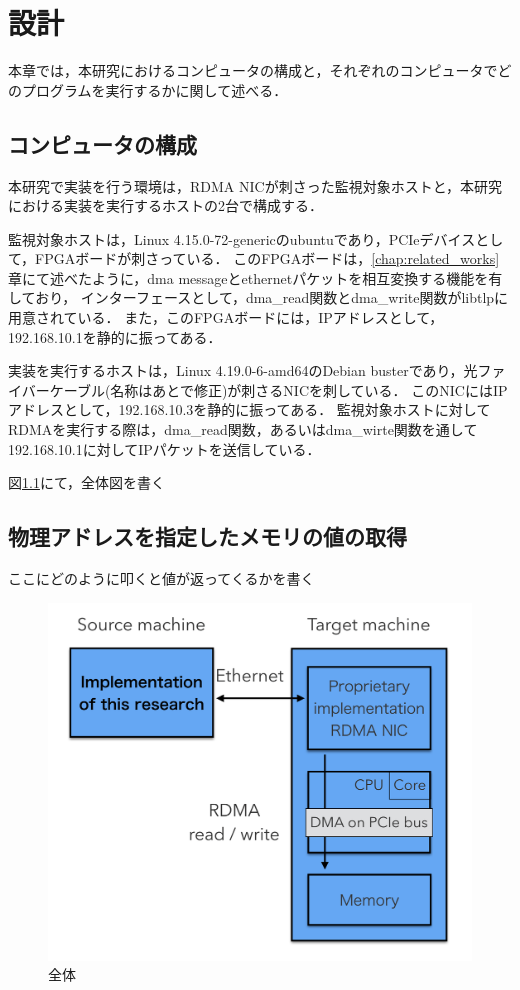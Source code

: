 \chapter{設計}
\label{chap:design}

本章では，本研究におけるコンピュータの構成と，それぞれのコンピュータでどのプログラムを実行するかに関して述べる．

\section{コンピュータの構成}

本研究で実装を行う環境は，RDMA NICが刺さった監視対象ホストと，本研究における実装を実行するホストの2台で構成する．

監視対象ホストは，Linux 4.15.0-72-genericのubuntuであり，PCIeデバイスとして，FPGAボードが刺さっている．
このFPGAボードは，\ref{chap:related_works}章にて述べたように，dma messageとethernetパケットを相互変換する機能を有しており，
インターフェースとして，dma_read関数とdma_write関数がlibtlpに用意されている．
また，このFPGAボードには，IPアドレスとして，192.168.10.1を静的に振ってある．

実装を実行するホストは，Linux 4.19.0-6-amd64のDebian busterであり，光ファイバーケーブル(名称はあとで修正)が刺さるNICを刺している．
このNICにはIPアドレスとして，192.168.10.3を静的に振ってある．
監視対象ホストに対してRDMAを実行する際は，dma_read関数，あるいはdma_wirte関数を通して192.168.10.1に対してIPパケットを送信している．

図\ref{fig:zentai}にて，全体図を書く

\section{物理アドレスを指定したメモリの値の取得}

ここにどのように叩くと値が返ってくるかを書く

\begin{figure}[htbp]
    \caption{全体}
    \label{fig:zentai}
    \begin{center}
        \includegraphics[bb=0 0 1000 530,width=15cm]{img/zentai.png}
    \end{center}
\end{figure}

